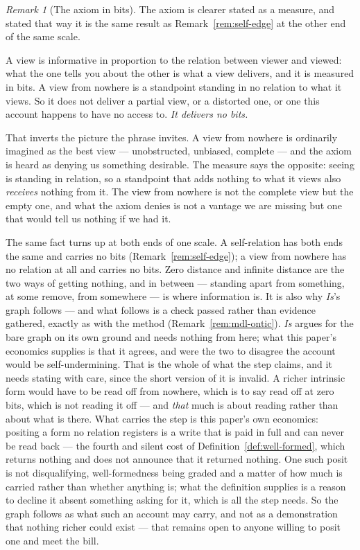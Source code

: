 \documentclass[11pt,a4paper]{article}
\theoremstyle{remark}\newtheorem{remark}[definition]{Remark}
\begin{document}
\begin{remark}[The axiom in bits]\label{rem:axiom-in-bits}
The axiom is clearer stated as a measure, and stated that way it is the same result as
Remark~\ref{rem:self-edge} at the other end of the same scale.

A view is informative in proportion to the relation between viewer and viewed: what the one tells you
about the other is what a view delivers, and it is measured in bits. A view from nowhere is a
standpoint standing in no relation to what it views. So it does not deliver a partial view, or a
distorted one, or one this account happens to have no access to. \emph{It delivers no bits.}

That inverts the picture the phrase invites. A view from nowhere is ordinarily imagined as the best
view --- unobstructed, unbiased, complete --- and the axiom is heard as denying us something desirable.
The measure says the opposite: seeing is standing in relation, so a standpoint that adds nothing to
what it views also \emph{receives} nothing from it. The view from nowhere is not the complete view but
the empty one, and what the axiom denies is not a vantage we are missing but one that would tell us
nothing if we had it.

The same fact turns up at both ends of one scale. A self-relation has both
ends the same and carries no bits (Remark~\ref{rem:self-edge}); a view from nowhere has no relation at
all and carries no bits. Zero distance and infinite distance are the two ways of getting nothing, and
in between --- standing apart from something, at some remove, from somewhere --- is where information
is. It is also why \emph{Is}'s graph follows --- and what follows is a check passed rather than
evidence gathered, exactly as with the method (Remark~\ref{rem:mdl-ontic}). \emph{Is} argues for
the bare graph on its own ground and needs nothing from here; what this paper's economics supplies is
that it agrees, and were the two to disagree the account would be self-undermining. That is the whole
of what the step claims, and it needs stating with care, since the short version of it is invalid. A richer intrinsic form would have to be read off from nowhere, which
is to say read off at zero bits, which is not reading it off --- and \emph{that} much is about reading
rather than about what is there. What carries the step is this paper's own economics: positing a form no
relation registers is a write that is paid in full and can never be read back --- the fourth and
silent cost of Definition~\ref{def:well-formed}, which returns nothing and does not announce that it
returned nothing. One such posit is not disqualifying, well-formedness being graded and a matter of
how much is carried rather than whether anything is; what the definition supplies is a reason to
decline it absent something asking for it, which is all the step needs. So the graph follows as what
such an account may carry, and not as a demonstration that nothing richer could exist --- that remains
open to anyone willing to posit one and meet the bill.


\end{remark}
\end{document}
